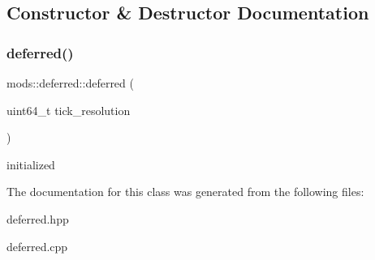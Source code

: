 \subsection{Constructor \& Destructor Documentation}
\mbox{\label{classmods_1_1deferred_a4ddaf679f5be96555258be883fa111e7}} 
\subsubsection{\texorpdfstring{deferred()}{deferred()}}
{\footnotesize\ttfamily mods\+::deferred\+::deferred (\begin{DoxyParamCaption}\item[{uint64\+\_\+t}]{tick\+\_\+resolution }\end{DoxyParamCaption})\hspace{0.3cm}{\ttfamily [inline]}}

initialized 

The documentation for this class was generated from the following files\+:\begin{DoxyCompactItemize}
\item 
deferred.\+hpp\item 
deferred.\+cpp\end{DoxyCompactItemize}
